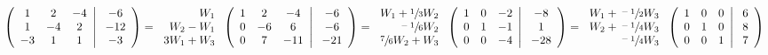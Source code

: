 \documentclass[a4paper,11pt]{article}
\begin{document}
\begin{dmath*}
\left (
\begin{array}{ccc}
1 & 2 & -4 \cr
1 & -4 & 2 \cr
-3 & 1 & 1 \cr
\end{array}
\right |
\left .
\begin{array}{c}
-6 \cr
-12 \cr
-3 \cr
\end{array}
\right )
=
\left .
\begin{array}{r}
W_1 \cr
W_2-W_1 \cr
3W_1+W_3 \cr
\end{array}
\right .
\left (
\begin{array}{ccc}
1 & 2 & -4 \cr
0 & -6 & 6 \cr
0 & 7 & -11 \cr
\end{array}
\right |
\left .
\begin{array}{c}
-6 \cr
-6 \cr
-21 \cr
\end{array}
\right )
=
\left .
\begin{array}{r}
W_1+\sfrac{1}{3}W_2 \cr
\sfrac{-1}{6}W_2 \cr
\sfrac{7}{6}W_2+W_3 \cr
\end{array}
\right .
\left (
\begin{array}{ccc}
1 & 0 & -2 \cr
0 & 1 & -1 \cr
0 & 0 & -4 \cr
\end{array}
\right |
\left .
\begin{array}{c}
-8 \cr
1 \cr
-28 \cr
\end{array}
\right )
=
\left .
\begin{array}{r}
W_1+\sfrac{-1}{2}W_3 \cr
W_2+\sfrac{-1}{4}W_3 \cr
\sfrac{-1}{4}W_3 \cr
\end{array}
\right .
\left (
\begin{array}{ccc}
1 & 0 & 0 \cr
0 & 1 & 0 \cr
0 & 0 & 1 \cr
\end{array}
\right |
\left .
\begin{array}{c}
6 \cr
8 \cr
7 \cr
\end{array}
\right )
\end{dmath*}
\end{document}
